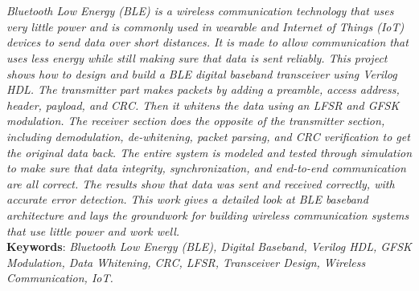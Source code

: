 \documentclass[12pt,singleside,a4paper]{report}
\begin{document}
\chapter*{}
\textit{Bluetooth Low Energy (BLE) is a wireless communication technology that uses very little power and is commonly used in wearable and Internet of Things (IoT) devices to send data over short distances. It is made to allow communication that uses less energy while still making sure that data is sent reliably. This project shows how to design and build a BLE digital baseband transceiver using Verilog HDL. The transmitter part makes packets by adding a preamble, access address, header, payload, and CRC. Then it whitens the data using an LFSR and GFSK modulation. The receiver section does the opposite of the transmitter section, including demodulation, de-whitening, packet parsing, and CRC verification to get the original data back. The entire system is modeled and tested through simulation to make sure that data integrity, synchronization, and end-to-end communication are all correct. The results show that data was sent and received correctly, with accurate error detection. This work gives a detailed look at BLE baseband architecture and lays the groundwork for building wireless communication systems that use little power and work well.}
\\



{\bf Keywords}: {\it Bluetooth Low Energy (BLE), Digital Baseband, Verilog HDL, GFSK Modulation, Data Whitening, CRC, LFSR, Transceiver Design, Wireless Communication, IoT.}





\tableofcontents %


\listoffigures
\end{document}
